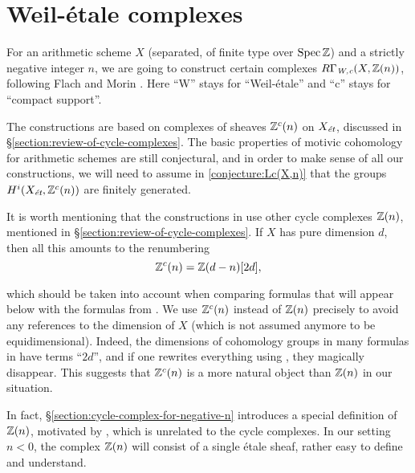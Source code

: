 \chapter{Weil-étale complexes}
\label{chapter:Weil-etale-complexes}

For an arithmetic scheme $X$ (separated, of finite type over $\operatorname{Spec} \mathbb{Z}$) and a
strictly negative integer $n$, we are going to construct certain complexes
$R\Gamma_\text{\it W,c} (X,\mathbb{Z}(n))$, following Flach and Morin
\cite{Morin-14,Flach-Morin-16}. Here ``W'' stays for ``Weil-étale'' and ``c''
stays for ``compact support''.

The constructions are based on complexes of sheaves $\mathbb{Z}^c (n)$ on
$X_\text{\it ét}$, discussed in \S\ref{section:review-of-cycle-complexes}.
The basic properties of motivic cohomology for arithmetic schemes are still
conjectural, and in order to make sense of all our constructions, we will need
to assume in \ref{conjecture:Lc(X,n)} that the groups
$H^i (X_\text{\it ét}, \mathbb{Z}^c (n))$ are finitely generated.

It is worth mentioning that the constructions in \cite{Flach-Morin-16} use other
cycle complexes $\mathbb{Z} (n)$, mentioned in
\S\ref{section:review-of-cycle-complexes}. If $X$ has pure dimension $d$, then
all this amounts to the renumbering
\begin{equation}
  \label{eqn:Z(n)c-and-Z(n)}
  \mathbb{Z}^c (n) = \mathbb{Z} (d-n) [2d],
\end{equation}

\noindent which should be taken into account when comparing formulas that will
appear below with the formulas from \cite{Flach-Morin-16}. We use $\mathbb{Z}^c (n)$
instead of $\mathbb{Z} (n)$ precisely to avoid any references to the dimension of $X$
(which is not assumed anymore to be equidimensional). Indeed, the dimensions of
cohomology groups in many formulas in \cite{Flach-Morin-16} have terms ``$2d$'',
and if one rewrites everything using , they magically
disappear. This suggests that $\mathbb{Z}^c (n)$ is a more natural object than
$\mathbb{Z} (n)$ in our situation.

In fact, \S\ref{section:cycle-complex-for-negative-n} introduces a special
definition of $\mathbb{Z} (n)$, motivated by \cite{Flach-Morin-16}, which is unrelated
to the cycle complexes. In our setting $n < 0$, the complex $\mathbb{Z} (n)$ will
consist of a single étale sheaf, rather easy to define and understand.

